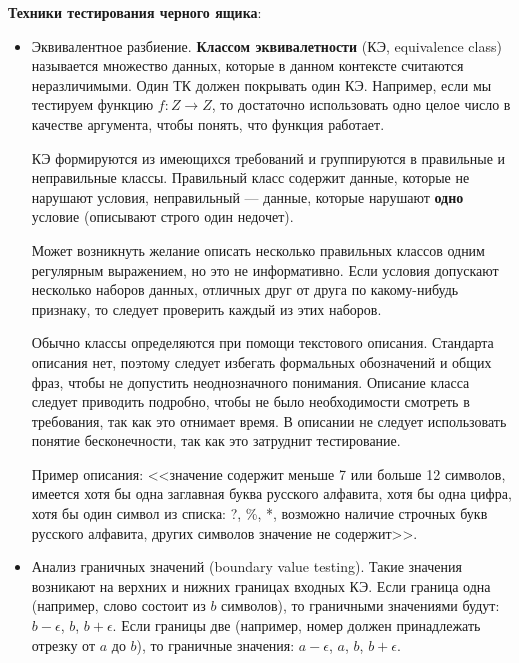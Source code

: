 \textbf{Техники тестирования черного ящика}:
\begin{itemize}
    \item Эквивалентное разбиение. \textbf{Классом эквивалетности} (КЭ,
        equivalence class) называется множество данных, которые в данном
        контексте считаются неразличимыми. Один ТК должен покрывать один КЭ.
        Например, если мы тестируем функцию $f : Z \to Z$, то достаточно
        использовать одно целое число в качестве аргумента, чтобы понять, что
        функция работает.

        КЭ формируются из имеющихся требований и группируются в правильные и
        неправильные классы. Правильный класс содержит данные, которые не
        нарушают условия, неправильный --- данные, которые нарушают
        \textbf{одно} условие (описывают строго один недочет). 

        Может возникнуть желание описать несколько правильных классов одним
        регулярным выражением, но это не информативно. Если условия допускают
        несколько наборов данных, отличных друг от друга по какому-нибудь
        признаку, то следует проверить каждый из этих наборов.

        Обычно классы определяются при помощи текстового описания. Стандарта
        описания нет, поэтому следует избегать формальных обозначений и общих
        фраз, чтобы не допустить неоднозначного понимания. Описание класса
        следует приводить подробно, чтобы не было необходимости смотреть в
        требования, так как это отнимает время. В описании не следует
        использовать понятие бесконечности, так как это затруднит тестирование.

        Пример описания: <<значение содержит меньше 7 или больше 12 символов,
        имеется хотя бы одна заглавная буква русского алфавита, хотя бы одна
        цифра, хотя бы один символ из списка: ?, \%, *, возможно наличие
        строчных букв русского алфавита, других символов значение не содержит>>.

    \item Анализ граничных значений (boundary value testing). Такие значения
        возникают на верхних и нижних границах входных КЭ. Если граница одна
        (например, слово состоит из $b$ символов), то граничными значениями
        будут: $b - \epsilon$, $b$, $b + \epsilon$. Если границы две (например,
        номер должен принадлежать отрезку от $a$ до $b$), то граничные
        значения: $a - \epsilon$, $a$, $b$, $b + \epsilon$.


\end{itemize}
